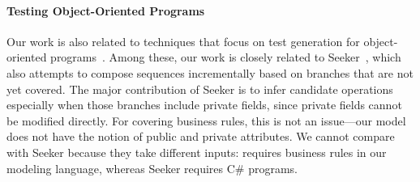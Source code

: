 \paragraph*{Testing Object-Oriented Programs} Our work is also related to
techniques that focus on test generation for object-oriented
programs~\cite{tillmann2008,thummalapenta2011, tonella:etoc}.
Among these, our work is closely related to Seeker~\cite{thummalapenta2011},
which also attempts to compose sequences incrementally based on branches that
are not yet covered. The major contribution of Seeker is to infer candidate
operations especially when those branches include private fields, since private
fields cannot be modified directly. For covering business rules, this is not an
issue---our model does not have the notion of public and private attributes. We
cannot compare \tool{} with Seeker because they take different inputs: \tool{}
requires business rules in our modeling language, whereas Seeker requires C\#
programs.

